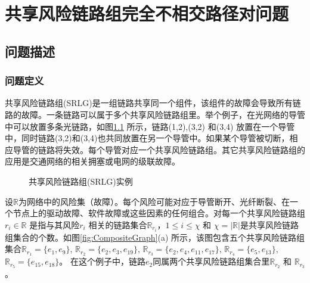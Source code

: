 \chapter{共享风险链路组完全不相交路径对问题}

\section{问题描述}
\subsection{问题定义}

共享风险链路组(SRLG)是一组链路共享同一个组件，该组件的故障会导致所有链路的故障。一条链路可以属于多个共享风险链路组里。举个例子，在光网络的导管中\cite{bhandari1994optimal}可以放置多条光链路，如图\ref{fig:Logic shift operation} 所示，链路(1,2),(3,2) 和(3,4) 放置在一个导管中，同时链路(3,2)和(3,4)也共同放置在另一个导管中。如果某个导管被切断，相应导管的链路将失效。每个导管对应一个共享风险链路组。其它共享风险链路组的应用是交通网络的相关拥塞或电网的级联故障\cite{coudert2007shared}。


\begin{figure}[htbp]
\centering
{}
\caption{共享风险链路组(SRLG)实例}\label{fig:SRLGgraph}
\label{fig:Logic shift operation}
\end{figure}

设$\mathbb{R}$为网络中的风险集（故障）。每个风险可能对应于导管断开、光纤断裂、在一个节点上的驱动故障、软件故障或这些因素的任何组合。对每一个共享风险链路组$r_i \in \mathbb{R}$ 是指与其风险$r_i$ 相关的链路集合$\mathbb{R}_{r_i}$，$1\leq i\leq \chi$ 和 $\chi=|{\mathbb{R}}|$是共享风险链路组集合的个数。如图\ref{fig:CompositeGraph}(a) 所示，该图包含五个共享风险链路组集合$\mathbb{R}_{r_1}=\{e_1,e_9\}$, $\mathbb{R}_{r_2}=\{e_2,e_3,e_{19}\}$, $\mathbb{R}_{r_3}=\{e_2,e_4,e_{11},e_{17}\}$, $\mathbb{R}_{r_4}=\{e_5,e_{13}\}$, $\mathbb{R}_{r_5}=\{e_{15},e_{18}\}$。 在这个例子中，链路$e_2$同属两个共享风险链路组集合里$\mathbb{R}_{r_2}$ 和 $\mathbb{R}_{r_3}$。

